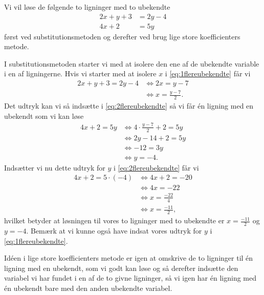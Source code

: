 Vi vil løse de følgende to ligninger med to ubekendte
\begin{align}
2x+y+3&=2y-4 \label{eq:1flereubekendte} \\
4x+2&=5y \label{eq:2flereubekendte}
\end{align}
først ved substitutionsmetoden og derefter ved brug lige store koefficienters metode.

I substitutionsmetoden starter vi med at isolere den ene af de ubekendte variable i en af ligningerne. Hvis vi starter med at isolere $x$ i \eqref{eq:1flereubekendte} får vi
\begin{align*}
2x+y+3 = 2y-4 &\Leftrightarrow 2x = y-7 \\
&\Leftrightarrow x = \frac{y-7}{2}.
\end{align*}
Det udtryk  kan vi så indsætte i \eqref{eq:2flereubekendte} så vi får én ligning med en ubekendt som vi kan løse
\begin{align*}
4x+2 = 5y &\Leftrightarrow 4 \cdot \frac{y-7}{2} + 2 = 5y \\
&\Leftrightarrow 2y-14 + 2 = 5y \\
&\Leftrightarrow -12 = 3y \\
&\Leftrightarrow y = -4.
\end{align*}
Indsætter vi nu dette udtryk for $y$ i \eqref{eq:2flereubekendte} får vi
\begin{align*}
4x+2=5 \cdot (-4) &\Leftrightarrow 4x+2=-20 \\
&\Leftrightarrow 4x = -22 \\
&\Leftrightarrow x = \frac{-22}{4} \\
&\Leftrightarrow x = \frac{-11}{2},
\end{align*}
hvilket betyder at løsningen til vores to ligninger med to ubekendte er $x= \frac{-11}{2}$ og $y=-4$. Bemærk at vi kunne også have indsat vores udtryk for $y$ i \eqref{eq:1flereubekendte}.


Idéen i lige store koefficienters metode er igen at omskrive de to ligninger til én ligning med en ubekendt, som vi godt kan løse og så derefter indsætte den variabel vi har fundet i en af de to givne ligninger, så vi igen har én ligning med én ubekendt bare med den anden ubekendte variabel.

